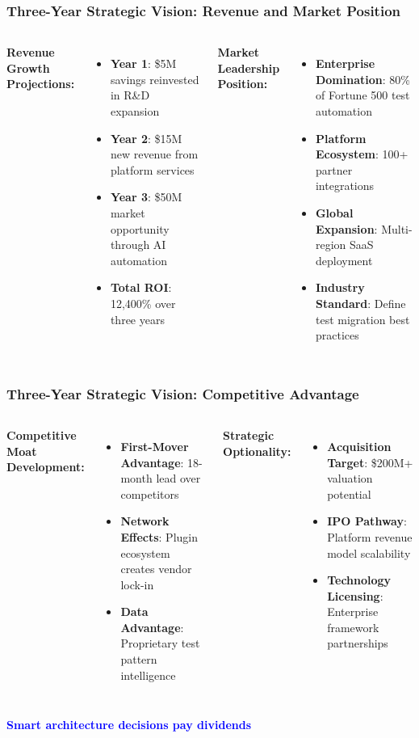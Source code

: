 \begin{frame}
\frametitle{Three-Year Strategic Vision: Revenue and Market Position}
\begin{columns}
\textbf{Revenue Growth Projections:}
\begin{itemize}
    \item \textbf{Year 1}: \$5M savings reinvested in R\&D expansion
    \item \textbf{Year 2}: \$15M new revenue from platform services
    \item \textbf{Year 3}: \$50M market opportunity through AI automation
    \item \textbf{Total ROI}: 12,400\% over three years
\end{itemize}

\textbf{Market Leadership Position:}
\begin{itemize}
    \item \textbf{Enterprise Domination}: 80\% of Fortune 500 test automation
    \item \textbf{Platform Ecosystem}: 100+ partner integrations
    \item \textbf{Global Expansion}: Multi-region SaaS deployment
    \item \textbf{Industry Standard}: Define test migration best practices
\end{itemize}
\end{columns}
\end{frame}

\begin{frame}
\frametitle{Three-Year Strategic Vision: Competitive Advantage}
\begin{columns}
\textbf{Competitive Moat Development:}
\begin{itemize}
    \item \textbf{First-Mover Advantage}: 18-month lead over competitors
    \item \textbf{Network Effects}: Plugin ecosystem creates vendor lock-in
    \item \textbf{Data Advantage}: Proprietary test pattern intelligence
\end{itemize}

\textbf{Strategic Optionality:}
\begin{itemize}
    \item \textbf{Acquisition Target}: \$200M+ valuation potential
    \item \textbf{IPO Pathway}: Platform revenue model scalability
    \item \textbf{Technology Licensing}: Enterprise framework partnerships
\end{itemize}
\end{columns}

\vspace{0.3cm}
\begin{center}
\textcolor{blue}{\textbf{Smart architecture decisions pay dividends}}
\end{center}
\end{frame}

